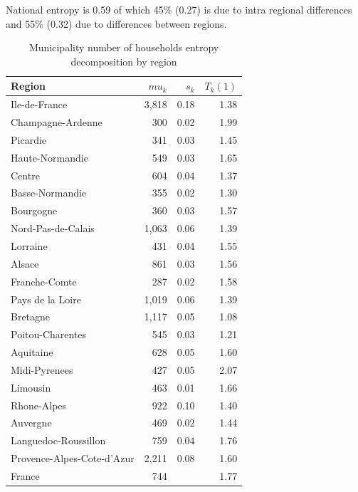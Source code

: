 \documentclass[11pt]{article}
\begin{document}
National entropy is 0.59 of which 45\% (0.27) is due to intra regional differences and 55\% (0.32) due to differences between regions.

\begin{table}[H]
\caption{Municipality number of households entropy decomposition by region}
\footnotesize

\begin{tabular}{lrrr}
\toprule
\toprule
Region                     & $mu_k$     &      $s_k$ &   $T_k(1)$ \\
\midrule
Ile-de-France              &      3,818 &       0.18 &       1.38 \\
Champagne-Ardenne          &        300 &       0.02 &       1.99 \\
Picardie                   &        341 &       0.03 &       1.45 \\
Haute-Normandie            &        549 &       0.03 &       1.65 \\
Centre                     &        604 &       0.04 &       1.37 \\
Basse-Normandie            &        355 &       0.02 &       1.30 \\
Bourgogne                  &        360 &       0.03 &       1.57 \\
Nord-Pas-de-Calais         &      1,063 &       0.06 &       1.39 \\
Lorraine                   &        431 &       0.04 &       1.55 \\
Alsace                     &        861 &       0.03 &       1.56 \\
Franche-Comte              &        287 &       0.02 &       1.58 \\
Pays de la Loire           &      1,019 &       0.06 &       1.39 \\
Bretagne                   &      1,117 &       0.05 &       1.08 \\
Poitou-Charentes           &        545 &       0.03 &       1.21 \\
Aquitaine                  &        628 &       0.05 &       1.60 \\
Midi-Pyrenees              &        427 &       0.05 &       2.07 \\
Limousin                   &        463 &       0.01 &       1.66 \\
Rhone-Alpes                &        922 &       0.10 &       1.40 \\
Auvergne                   &        469 &       0.02 &       1.44 \\
Languedoc-Roussillon       &        759 &       0.04 &       1.76 \\
Provence-Alpes-Cote-d'Azur &      2,211 &       0.08 &       1.60 \\
\midrule
France                     &        744 &            &       1.77 \\
\bottomrule
\end{tabular}

\end{table}
\end{document}
